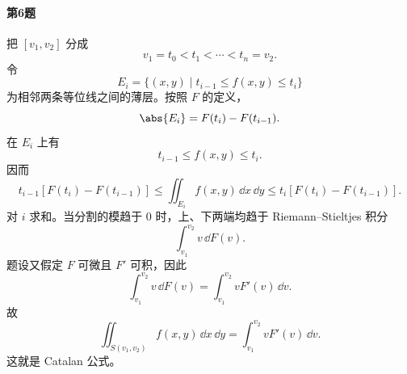 \paragraph{第6题}
\begin{xsolution}
把 $[v_1,v_2]$ 分成
\[
  v_1=t_0<t_1<\cdots<t_n=v_2.
\]
令
\[
  E_i=\{(x,y)\mid t_{i-1}\le f(x,y)\le t_i\}
\]
为相邻两条等位线之间的薄层。按照 $F$ 的定义，
\[
  \abs{E_i}=F(t_i)-F(t_{i-1}).
\]
在 $E_i$ 上有
\[
  t_{i-1}\le f(x,y)\le t_i.
\]
因而
\[
  t_{i-1}[F(t_i)-F(t_{i-1})]
  \le\iint_{E_i}f(x,y)\,\dd x\,\dd y
  \le t_i[F(t_i)-F(t_{i-1})].
\]
对 $i$ 求和。当分割的模趋于 $0$ 时，上、下两端均趋于 Riemann--Stieltjes 积分
\[
  \int_{v_1}^{v_2}v\,\dd F(v).
\]
题设又假定 $F$ 可微且 $F'$ 可积，因此
\[
  \int_{v_1}^{v_2}v\,\dd F(v)
  =\int_{v_1}^{v_2}vF'(v)\,\dd v.
\]
故
\[
  \boxed{
  \iint_{S(v_1,v_2)}f(x,y)\,\dd x\,\dd y
  =\int_{v_1}^{v_2}vF'(v)\,\dd v}.
\]
这就是 Catalan 公式。
\end{xsolution}
